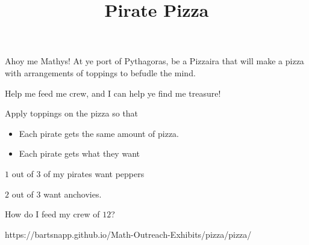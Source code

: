 \documentclass{../exhibit}
\title{Pirate Pizza}
\begin{document}
\begin{context}
  Ahoy me Mathys! At ye port of Pythagoras, be a Pizzaira that will
  make a pizza with arrangements of toppings to befudle the mind.


  \vspace{1cm}

  
  Help me feed me crew, and I can help ye find me treasure!
\end{context}



\begin{directions}
  Apply toppings on the pizza so that
  \begin{itemize}
  \item Each pirate gets the same amount of pizza.
  \item Each pirate gets what they want
  \end{itemize}
\end{directions}



\begin{example}
  $1$ out of $3$ of my pirates want peppers

  $2$ out of $3$ want anchovies.


  How do I feed my crew of $12$?
\begin{center}
\end{center}
\end{example}



\begin{mathConnections}
  https://bartsnapp.github.io/Math-Outreach-Exhibits/pizza/pizza/
\end{mathConnections}
\end{document}
